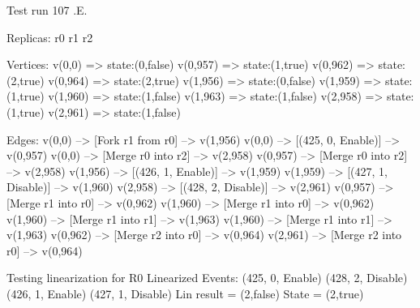  Test run 107
.E.

Replicas:
r0
r1
r2

Vertices:
v(0,0) => state:(0,false)
v(0,957) => state:(1,true)
v(0,962) => state:(2,true)
v(0,964) => state:(2,true)
v(1,956) => state:(0,false)
v(1,959) => state:(1,true)
v(1,960) => state:(1,false)
v(1,963) => state:(1,false)
v(2,958) => state:(1,true)
v(2,961) => state:(1,false)

Edges:
v(0,0) --> [Fork r1 from r0] --> v(1,956)
v(0,0) --> [(425, 0, Enable)] --> v(0,957)
v(0,0) --> [Merge r0 into r2] --> v(2,958)
v(0,957) --> [Merge r0 into r2] --> v(2,958)
v(1,956) --> [(426, 1, Enable)] --> v(1,959)
v(1,959) --> [(427, 1, Disable)] --> v(1,960)
v(2,958) --> [(428, 2, Disable)] --> v(2,961)
v(0,957) --> [Merge r1 into r0] --> v(0,962)
v(1,960) --> [Merge r1 into r0] --> v(0,962)
v(1,960) --> [Merge r1 into r1] --> v(1,963)
v(1,960) --> [Merge r1 into r1] --> v(1,963)
v(0,962) --> [Merge r2 into r0] --> v(0,964)
v(2,961) --> [Merge r2 into r0] --> v(0,964)

Testing linearization for R0
Linearized Events:
(425, 0, Enable)
(428, 2, Disable)
(426, 1, Enable)
(427, 1, Disable)
Lin result = (2,false)
State = (2,true)